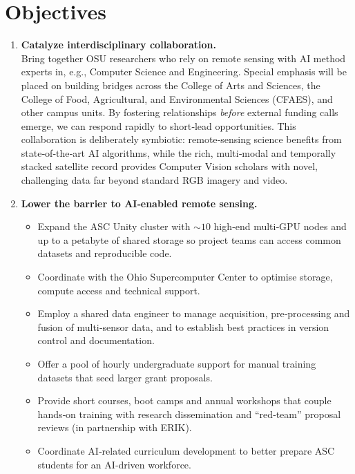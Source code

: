 \documentclass{article}
\begin{document}
\section*{Objectives}
\begin{enumerate}[label=\arabic*.]
\item \textbf{Catalyze interdisciplinary collaboration.}\\
Bring together OSU researchers who rely on remote sensing with AI method experts in, e.g., Computer Science and Engineering. Special emphasis will be placed on building bridges across the College of Arts and Sciences, the College of Food, Agricultural, and Environmental Sciences (CFAES), and other campus units. By fostering relationships \emph{before} external funding calls emerge, we can respond rapidly to short‐lead opportunities. This collaboration is deliberately symbiotic: remote‐sensing science benefits from state‐of‐the‐art AI algorithms, while the rich, multi‐modal and temporally stacked satellite record provides Computer Vision scholars with novel, challenging data far beyond standard RGB imagery and video.

\item \textbf{Lower the barrier to AI‐enabled remote sensing.}    \begin{itemize}[leftmargin=*]
    \item Expand the ASC Unity cluster with $\sim 10 $ high‐end multi‐GPU nodes and up to a petabyte of shared storage so project teams can access common datasets and reproducible code.
    \item Coordinate with the Ohio Supercomputer Center to optimise storage, compute access and technical support.
    \item Employ a shared data engineer to manage acquisition, pre‐processing and fusion of multi‐sensor data, and to establish best practices in version control and documentation.
    \item Offer a  pool of hourly undergraduate support for manual training datasets that seed larger grant proposals.
    \item Provide short courses, boot camps and annual workshops that couple hands‐on training with research dissemination and “red‐team” proposal reviews (in partnership with ERIK).
    \item Coordinate AI‐related curriculum development to better prepare ASC students for an AI‐driven workforce.
    \end{itemize}


\end{enumerate}
\end{document}
